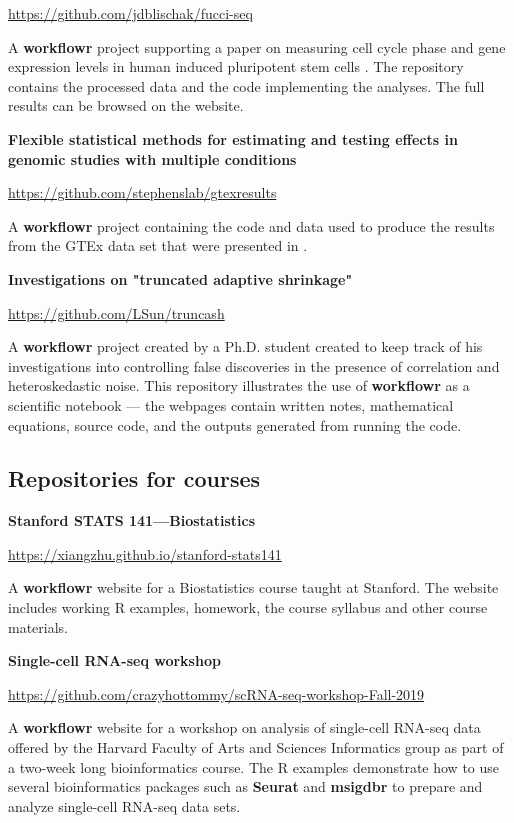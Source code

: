 \documentclass[9pt,a4paper]{extarticle}
\begin{document}
\url{https://github.com/jdblischak/fucci-seq}

A \textbf{workflowr} project supporting a paper on measuring cell cycle phase and
gene expression levels in human induced pluripotent stem cells
\cite{Hsiao2019}. The repository contains the processed data and the
code implementing the analyses. The full results can be browsed on the
website.

\textbf{Flexible statistical methods for estimating and testing effects
in genomic studies with multiple conditions}

\url{https://github.com/stephenslab/gtexresults}

A \textbf{workflowr} project containing the code and data used to produce the
results from the GTEx data set that were presented in \cite{Urbut2019}.

\textbf{Investigations on "truncated adaptive shrinkage"}

\url{https://github.com/LSun/truncash}

A \textbf{workflowr} project created by a Ph.D. student created to keep track of
his investigations into controlling false discoveries in the presence of
correlation and heteroskedastic noise. This repository illustrates the
use of \textbf{workflowr} as a scientific notebook --- the webpages contain
written notes, mathematical equations, source code, and the outputs
generated from running the code.

\subsection*{Repositories for courses}

\textbf{Stanford STATS 141—Biostatistics}

\url{https://xiangzhu.github.io/stanford-stats141}

A \textbf{workflowr} website for a Biostatistics course taught at Stanford. The
website includes working R examples, homework, the course syllabus and
other course materials.

\textbf{Single-cell RNA-seq workshop}

\url{https://github.com/crazyhottommy/scRNA-seq-workshop-Fall-2019}

A \textbf{workflowr} website for a workshop on analysis of single-cell RNA-seq
data offered by the Harvard Faculty of Arts and Sciences Informatics
group as part of a two-week long bioinformatics course. The R examples
demonstrate how to use several bioinformatics packages such as \textbf{Seurat}
and \textbf{msigdbr} to prepare and analyze single-cell RNA-seq data sets.
\end{document}
